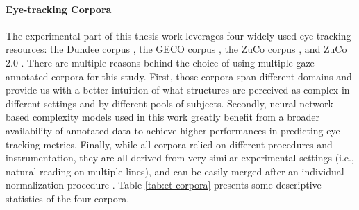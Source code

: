 \documentclass[a4paper, nobind]{templates/ociamthesis}
\begin{document}
\paragraph{Eye-tracking Corpora} The experimental part of this thesis work leverages four widely used eye-tracking resources: the Dundee corpus \autocite{kennedy-etal-2003-dundee}, the GECO corpus \autocite{cop-etal-2017-presenting}, the ZuCo corpus \autocite{hollenstein-2018-zuco}, and ZuCo 2.0 \autocite{hollenstein-etal-2020-zuco}. There are multiple reasons behind the choice of using multiple gaze-annotated corpora for this study. First, those corpora span different domains and provide us with a better intuition of what structures are perceived as complex in different settings and by different pools of subjects. Secondly, neural-network-based complexity models used in this work greatly benefit from a broader availability of annotated data to achieve higher performances in predicting eye-tracking metrics. Finally, while all corpora relied on different procedures and instrumentation, they are all derived from very similar experimental settings (i.e., natural reading on multiple lines), and can be easily merged after an individual normalization procedure \autocite{hollenstein-zhang-2019-entity}. Table \ref{tab:et-corpora} presents some descriptive statistics of the four corpora.
\end{document}
